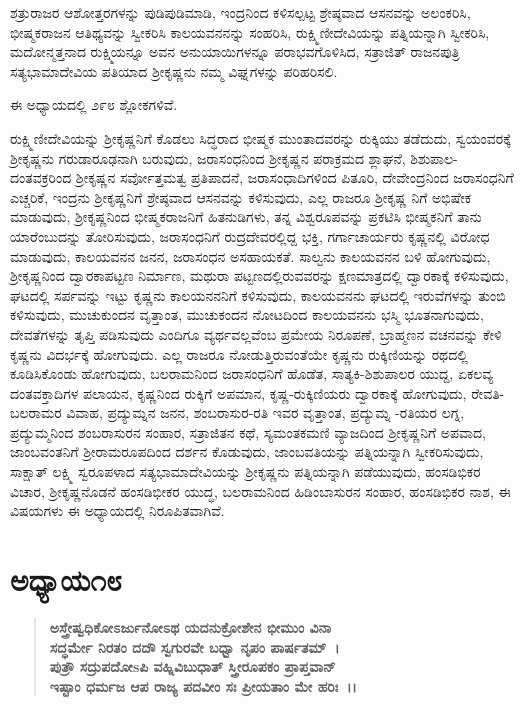 ಶತ್ರುರಾಜರ ಆಶೋತ್ತರಗಳನ್ನು ಪುಡಿಪುಡಿಮಾಡಿ, ಇಂದ್ರನಿಂದ ಕಳಿಸಲ್ಪಟ್ಟ ಶ್ರೇಷ್ಠವಾದ ಆಸನವನ್ನು ಅಲಂಕರಿಸಿ, ಭೀಷ್ಮಕರಾಜನ ಆತಿಥ್ಯವನ್ನು ಸ್ವೀಕರಿಸಿ ಕಾಲಯವನನನ್ನು ಸಂಹರಿಸಿ, ರುಕ್ಷ್ಮಿಣೀದೇವಿಯನ್ನು ಪತ್ನಿಯನ್ನಾಗಿ ಸ್ವೀಕರಿಸಿ, ಮದೋನ್ಮತ್ತನಾದ ರುಕ್ಷ್ಮಿಯನ್ನೂ ಅವನ ಅನುಯಾಯಿಗಳನ್ನೂ ಪರಾಭವಗೊಳಿಸಿದ, ಸತ್ರಾಜಿತ್ ರಾಜನಪುತ್ರಿ ಸತ್ಯಭಾಮಾದೇವಿಯ ಪತಿಯಾದ ಶ‍್ರೀಕೃಷ್ಣನು ನಮ್ಮ ವಿಘ್ನಗಳನ್ನು ಪರಿಹರಿಸಲಿ.

ಈ ಅಧ್ಯಾಯದಲ್ಲಿ ೨೯೮ ಶ್ಲೋಕಗಳಿವೆ.

ರುಕ್ಷ್ಮಿಣೀದೇವಿಯನ್ನು ಶ‍್ರೀಕೃಷ್ಣನಿಗೆ ಕೊಡಲು ಸಿದ್ಧರಾದ ಭೀಷ್ಮಕ ಮುಂತಾದವರನ್ನು ರುಕ್ಕಿಯು ತಡೆದುದು, ಸ್ವಯಂವರಕ್ಕೆ ಶ‍್ರೀಕೃಷ್ಣನು ಗರುಡಾರೂಢನಾಗಿ ಬರುವುದು, ಜರಾಸಂಧನಿಂದ ಶ‍್ರೀಕೃಷ್ಣನ ಪರಾಕ್ರಮದ ಶ್ಲಾಘನೆ, ಶಿಶುಪಾಲ-ದಂತವಕ್ರರಿಂದ ಶ‍್ರೀಕೃಷ್ಣನ ಸರ್ವೋತ್ತಮತ್ವ ಪ್ರತಿಪಾದನೆ, ಜರಾಸಂಧಾದಿಗಳಿಂದ ಪಿತೂರಿ, ದೇವೇಂದ್ರನಿಂದ ಜರಾಸಂಧನಿಗೆ ಎಚ್ಚರಿಕೆ, ಇಂದ್ರನು ಶ‍್ರೀಕೃಷ್ಣನಿಗೆ ಶ್ರೇಷ್ಠವಾದ ಆಸನವನ್ನು ಕಳಿಸುವುದು, ಎಲ್ಲ ರಾಜರೂ ಶ‍್ರೀಕೃಷ್ಣ ನಿಗೆ ಅಭಿಷೇಕ ಮಾಡುವುದು, ಶ‍್ರೀಕೃಷ್ಣನಿಂದ ಭೀಷ್ಮಕರಾಜನಿಗೆ ಹಿತನುಡಿಗಳು, ತನ್ನ ವಿಶ್ವರೂಪವನ್ನು ಪ್ರಕಟಿಸಿ ಭೀಷ್ಮಕನಿಗೆ ತಾನು ಯಾರೆಂಬುದನ್ನು ತೋರಿಸುವುದು, ಜರಾಸಂಧನಿಗೆ ರುದ್ರದೇವರಲ್ಲಿದ್ದ ಭಕ್ತಿ, ಗರ್ಗಾಚಾರ್ಯರು ಕೃಷ್ಣನಲ್ಲಿ ವಿರೋಧ ಮಾಡುವುದು, ಕಾಲಯವನನ ಜನನ, ಜರಾಸಂಧನ ಅಸಹಾಯಕತೆ. ಸಾಲ್ವನು ಕಾಲಯವನನ ಬಳಿ ಹೋಗುವುದು, ಶ‍್ರೀಕೃಷ್ಣನಿಂದ ದ್ವಾರಕಾಪಟ್ಟಣ ನಿರ್ಮಾಣ, ಮಥುರಾ ಪಟ್ಟಣದಲ್ಲಿರುವವರನ್ನು ಕ್ಷಣಮಾತ್ರದಲ್ಲಿ ದ್ವಾರಕಾಕ್ಕೆ ಕಳಿಸುವುದು, ಘಟದಲ್ಲಿ ಸರ್ಪವನ್ನು ಇಟ್ಟು ಕೃಷ್ಣನು ಕಾಲಯನನನಿಗೆ ಕಳಿಸುವುದು, ಕಾಲಯವನನು ಘಟದಲ್ಲಿ ಇರುವೆಗಳನ್ನು ತುಂಬಿ ಕಳಿಸುವುದು, ಮುಚುಕುಂದನ ವೃತ್ತಾಂತ, ಮುಚುಕಂದನ ನೋಟದಿಂದ ಕಾಲಯವನನು ಭಸ್ಮಿ ಭೂತನಾಗುವುದು, ದೇವತೆಗಳನ್ನು ತೃಪ್ತಿ ಪಡಿಸುವುದು ಎಂದಿಗೂ ವ್ಯರ್ಥವಲ್ಲವೆಂಬ ಪ್ರಮೇಯ ನಿರೂಪಣೆ, ಬ್ರಾಹ್ಮಣನ ವಚನವನ್ನು ಕೇಳಿ ಕೃಷ್ಣನು ವಿದರ್ಭಕ್ಕೆ ಹೋಗುವುದು. ಎಲ್ಲ ರಾಜರೂ ನೋಡುತ್ತಿರುವಂತೆಯೇ ಕೃಷ್ಣನು ರುಕ್ಕಿಣಿಯನ್ನು ರಥದಲ್ಲಿ ಕೂಡಿಸಿಕೊಂಡು ಹೋಗುವುದು, ಬಲರಾಮನಿಂದ ಜರಾಸಂಧನಿಗೆ ಹೊಡೆತ, ಸಾತ್ಯಕಿ-ಶಿಶುಪಾಲರ ಯುದ್ದ, ಏಕಲವ್ಯ ದಂತವಕ್ತಾದಿಗಳ ಪಲಾಯನ, ಕೃಷ್ಣನಿಂದ ರುಕ್ಕಿಗೆ ಅಪಮಾನ, ಕೃಷ್ಣ-\-ರುಕ್ಕಿಣಿಯರು ದ್ವಾರಕಾಕ್ಕೆ ಹೋಗುವುದು, ರೇವತಿ-ಬಲರಾಮರ ವಿವಾಹ, ಪ್ರದ್ಯುಮ್ನನ ಜನನ, ಶಂಬರಾಸುರ-ರತಿ ಇವರ ವೃತ್ತಾಂತ, ಪ್ರದ್ಯುಮ್ನ -ರತಿಯರ ಲಗ್ನ, ಪ್ರದ್ಯುಮ್ಮನಿಂದ ಶಂಬರಾಸುರನ ಸಂಹಾರ, ಸತ್ರಾಜಿತನ ಕಥೆ, ಸ್ಯಮಂತಕಮಣಿ ವ್ಯಾಜದಿಂದ ಶ‍್ರೀಕೃಷ್ಣನಿಗೆ ಅಪವಾದ, ಜಾಂಬವಂತನಿಗೆ ಶ‍್ರೀರಾಮರೂಪದಿಂದ ದರ್ಶನ ಕೊಡುವುದು, ಜಾಂಬವತಿಯನ್ನು ಪತ್ನಿಯನ್ನಾಗಿ ಸ್ವೀಕರಿಸುವುದು, ಸಾಕ್ಷಾತ್ ಲಕ್ಷ್ಮಿ ಸ್ವರೂಪಳಾದ ಸತ್ಯಭಾಮಾದೇವಿಯನ್ನು ಶ‍್ರೀಕೃಷ್ಣನು ಪತ್ನಿಯನ್ನಾಗಿ ಪಡೆಯುವುದು, ಹಂಸಡಿಭಿಕರ ವಿಚಾರ, ಶ‍್ರೀಕೃಷ್ಣನೊಡನೆ ಹಂಸಡಿಭೀಕರ ಯುದ್ಧ, ಬಲರಾಮನಿಂದ ಹಿಡಿಂಬಾಸುರನ ಸಂಹಾರ, ಹಂಸಡಿಭಿಕರ ನಾಶ, ಈ ವಿಷಯಗಳು ಈ ಅಧ್ಯಾಯದಲ್ಲಿ ನಿರೂಪಿತವಾಗಿವೆ.


\section*{ಅಧ್ಯಾಯ\enginline{-}೧೮}

\begin{verse}
\textbf{ಅಸ್ತ್ರೇಷ್ವಧಿಕೋಽರ್ಜುನೋಽಥ ಯದನುಕ್ರೋಶೇನ ಭೀಮುಂ ವಿನಾ}\\\textbf{ಸದ್ಧರ್ಮೇ ನಿರತಂ ದದೌ ಸ್ವಗುರವೇ ಬಧ್ವಾ ನೃಪಂ ಪಾರ್ಷತಮ್~।}\\\textbf{ಪುತ್ರೌ ಸದ್ರುಪದೋsಪಿ ವಹ್ನಿವಿಬುಧಾತ್ ಸ್ತ್ರೀರೂಪಕಂ ಪ್ರಾಪ್ತವಾನ್}\\\textbf{ ಇಷ್ಟಾಂ ಧರ್ಮಜ ಆಪ ರಾಜ್ಯ ಪದವೀಂ ಸಃ ಪ್ರೀಯತಾಂ ಮೇ ಹರಿಃ~।।}
\end{verse}

